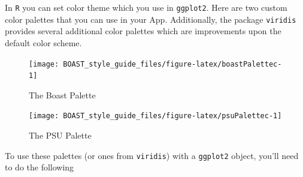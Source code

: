 \documentclass[
]{book}
\newenvironment{Shaded}{\begin{snugshade}}{\end{snugshade}}
\newcommand{\CommentTok}[1]{\textcolor[rgb]{0.56,0.35,0.01}{\textit{#1}}}
\newcommand{\KeywordTok}[1]{\textcolor[rgb]{0.13,0.29,0.53}{\textbf{#1}}}
\newcommand{\NormalTok}[1]{#1}
\newcommand{\StringTok}[1]{\textcolor[rgb]{0.31,0.60,0.02}{#1}}
\begin{document}
In \texttt{R} you can set color theme which you use in \texttt{ggplot2}. Here are two custom color palettes that you can use in your App. Additionally, the package \texttt{viridis} provides several additional color palettes which are improvements upon the default color scheme.

\begin{Shaded}
\end{Shaded}

\begin{figure}

{\centering \texttt{[image: BOAST\_style\_guide\_files/figure-latex/boastPalettec-1]} 

}

\caption{The Boast Palette}\label{fig:boastPalettec}
\end{figure}

\begin{figure}

{\centering \texttt{[image: BOAST\_style\_guide\_files/figure-latex/psuPalettec-1]} 

}

\caption{The PSU Palette}\label{fig:psuPalettec}
\end{figure}

To use these palettes (or ones from \texttt{viridis}) with a \texttt{ggplot2} object, you'll need to do the following
\end{document}
